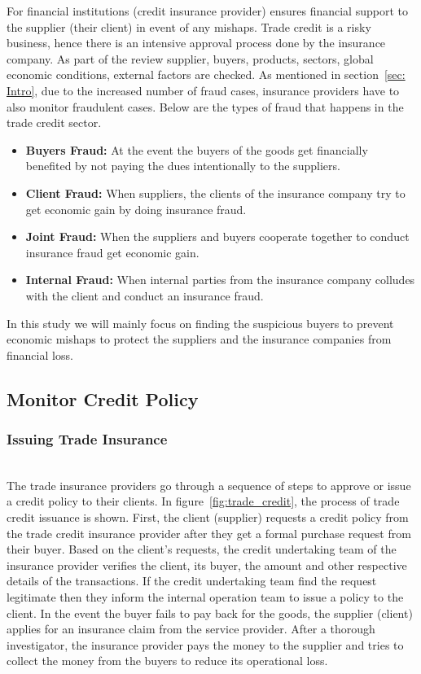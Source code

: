For financial institutions (credit insurance provider) ensures financial support to the supplier (their client) in event of any mishaps. Trade credit is a risky business, hence there is an intensive approval process done by the insurance company. As part of the review supplier, buyers, products, sectors, global economic conditions, external factors are checked. As mentioned in section~\ref{sec: Intro}, due to the increased number of fraud cases, insurance providers have to also monitor fraudulent cases. Below are the types of fraud that happens in the trade credit sector.

\begin{itemize}
    \item \textbf{Buyers Fraud:} At the event the buyers of the goods get financially benefited by not paying the dues intentionally to the suppliers.
    \item \textbf{Client Fraud:} When suppliers, the clients of the insurance company try to get economic gain by doing insurance fraud.
    \item \textbf{Joint Fraud:} When the suppliers and buyers cooperate together to conduct insurance fraud get economic gain.
    \item \textbf{Internal Fraud:} When internal parties from the insurance company colludes with the client and conduct an insurance fraud.
\end{itemize}

In this study we will mainly focus on finding the suspicious buyers to prevent economic mishaps to protect the suppliers and the insurance companies from financial loss.


\subsection{Monitor Credit Policy}\label{subsec:monitor-credit-policy}

\subsubsection{Issuing Trade Insurance}\hspace*{\fill} \\
The trade insurance providers go through a sequence of steps to approve or issue a credit policy to their clients. In figure~\ref{fig:trade_credit}, the process of trade credit issuance is shown. First, the client (supplier) requests a credit policy from the trade credit insurance provider after they get a formal purchase request from their buyer. Based on the client's requests, the credit undertaking team of the insurance provider verifies the client, its buyer, the amount and other respective details of the transactions. If the credit undertaking team find the request legitimate then they inform the internal operation team to issue a policy to the client. In the event the buyer fails to pay back for the goods, the supplier (client) applies for an insurance claim from the service provider. After a thorough investigator, the insurance provider pays the money to the supplier and tries to collect the money from the buyers to reduce its operational loss.

